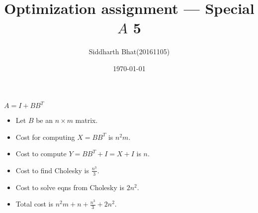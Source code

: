 \documentclass[11pt]{article}
\author{Siddharth Bhat(20161105)}
\title{Optimization assignment --- Special $A$ 5}
\date{\today}
\begin{document}
\maketitle
\thispagestyle{fancy}
$A = I + BB^T$
\begin{itemize}
    \item Let $B$ be an $n \times m$ matrix.
    \item Cost for computing $X = BB^T$ is $n^2m$.
    \item Cost to compute $Y = BB^T + I = X + I$ is $n$.
    \item Cost to find Cholesky is $\frac{n^3}{3}$.
    \item Cost to solve eqns from Cholesky is $2n^2$.
    \item Total cost is $n^2m + n + \frac{n^3}{3} + 2n^2$.
\end{itemize}
\end{document}
